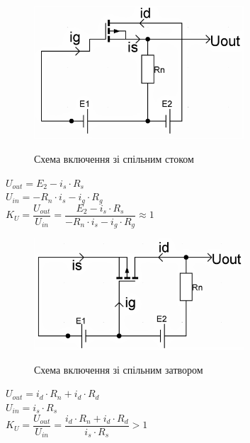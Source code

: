 \documentclass[a4paper,14pt]{extreport}
\begin{document}
\newpage

\begin{figure}[!h]
\caption{Схема включення зі спільним стоком}
{\includegraphics[width=0.7\textwidth]{comdrain}}
 \end{figure}

\begin{center}
$U_{out}=E_2-i_s\cdot{R_s}$\\[0.5cm]

$U_{in}=-R_n\cdot{i_s}-i_g\cdot{R_g}$\\[0.5cm]

$K_U=\dfrac{U_{out}}{U_{in}}=\dfrac{E_2-i_s\cdot{R_s}}{-R_n\cdot{i_s}-i_g\cdot{R_g}}\approx 1$
\end{center}
 
\newpage

\begin{figure}[!h]
\caption{Схема включення зі спільним затвором}
{\includegraphics[width=0.7\textwidth]{comgate}}
 \end{figure}


\begin{center}
$U_{out}=i_d\cdot{R_n}+i_d\cdot{R_d}$\\[0.5cm]

$U_{in}=i_s\cdot{R_s}$\\[0.5cm]

$K_U=\dfrac{U_{out}}{U_{in}}=\dfrac{i_d\cdot{R_n}+i_d\cdot{R_d}}{i_s\cdot{R_s}}>1$
\end{center}
\end{document}
